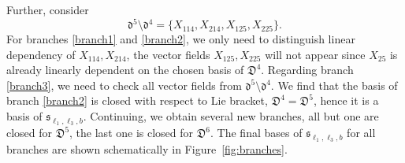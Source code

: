 \documentclass{amsart}
\theoremstyle{plain}
\theoremstyle{definition}
\theoremstyle{remark}
\newcommand{\mfk}[1]{\mathfrak{#1}}
\begin{document}
Further, consider
\[ \mfk{d}^5 \setminus \mfk{d}^4 = \{X_{114}, X_{214}, X_{125}, X_{225}\}. \]
For branches \ref{branch1} and \ref{branch2}, we only need to distinguish linear dependency of $X_{114}, X_{214}$, the vector fields $X_{125}, X_{225}$ will not appear since $X_{25}$ is already linearly dependent on the chosen basis of $\mfk{D}^4$. Regarding branch \ref{branch3}, we need to check all vector fields from $\mfk{d}^5 \setminus \mfk{d}^4$. We find that the basis of branch \ref{branch2} is closed with respect to Lie bracket, $\mfk{D}^4 = \mfk{D}^5$, hence it is a basis of $\mfk{s}_{\ell_1, \ell_3, b}$. Continuing, we obtain several new branches, all but one are closed for $\mfk{D}^5$, the last one is closed for $\mfk{D}^6$. The final bases of $\mfk{s}_{\ell_1, \ell_3, b}$ for all branches are shown schematically in Figure~\ref{fig:branches}.
\end{document}
